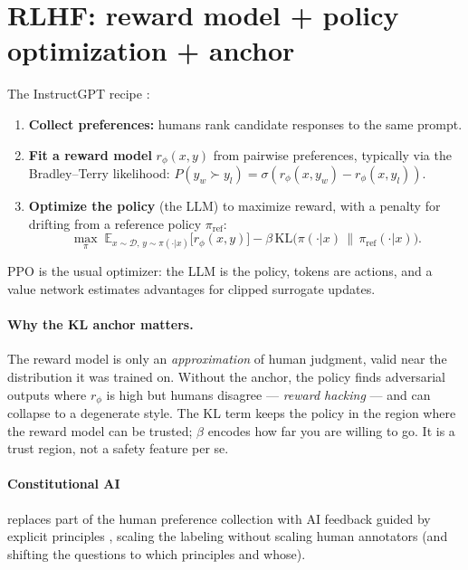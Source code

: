 \documentclass[11pt]{article}
\begin{document}
\section{RLHF: reward model + policy optimization + anchor}
The InstructGPT recipe \cite{ouyang2022training}:
\begin{enumerate}[noitemsep]
\item \textbf{Collect preferences:} humans rank candidate responses to the same prompt.
\item \textbf{Fit a reward model} $r_\phi(x, y)$ from pairwise preferences, typically via the Bradley--Terry likelihood: $P(y_w \succ y_l) = \sigma(r_\phi(x,y_w) - r_\phi(x,y_l))$.
\item \textbf{Optimize the policy} (the LLM) to maximize reward, with a penalty for drifting from a reference policy $\pi_\text{ref}$:
\begin{equation}
\max_\pi \; \mathbb{E}_{x \sim \mathcal{D},\, y \sim \pi(\cdot|x)}\big[ r_\phi(x,y) \big] - \beta\, \mathrm{KL}\!\big(\pi(\cdot|x) \,\|\, \pi_\text{ref}(\cdot|x)\big).
\label{eq:rlhf}
\end{equation}
\end{enumerate}
PPO \cite{schulman2017ppo} is the usual optimizer: the LLM is the policy, tokens are actions, and a value network estimates advantages for clipped surrogate updates.

\paragraph{Why the KL anchor matters.} The reward model is only an \emph{approximation} of human judgment, valid near the distribution it was trained on. Without the anchor, the policy finds adversarial outputs where $r_\phi$ is high but humans disagree --- \emph{reward hacking} --- and can collapse to a degenerate style. The KL term keeps the policy in the region where the reward model can be trusted; $\beta$ encodes how far you are willing to go. It is a trust region, not a safety feature per se.

\paragraph{Constitutional AI} replaces part of the human preference collection with AI feedback guided by explicit principles \cite{bai2022constitutional}, scaling the labeling without scaling human annotators (and shifting the questions to which principles and whose).
\end{document}
